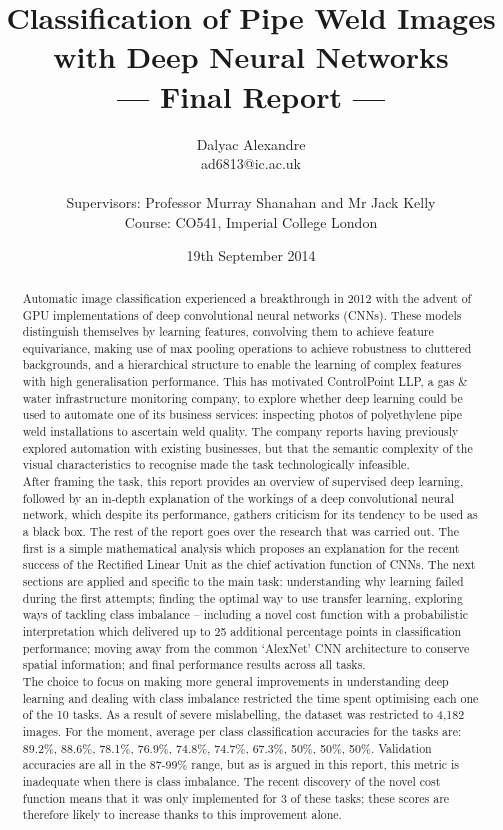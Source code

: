 \documentclass[a4paper,11pt]{article}
\title{Classification of Pipe Weld Images with Deep Neural Networks\\\Large{--- Final Report ---}}
\author{Dalyac Alexandre\\
       ad6813@ic.ac.uk\\ \\
       \small{Supervisors: Professor Murray Shanahan and Mr Jack Kelly}\\
       \small{Course: CO541, Imperial College London}
\date{19th September 2014}
}
\begin{document}
\maketitle

\begin{abstract}

{
Automatic image classification experienced a breakthrough in 2012 with the advent of GPU implementations of deep convolutional neural networks (CNNs). These models distinguish themselves by learning features, convolving them to achieve feature equivariance, making use of max pooling operations to achieve robustness to cluttered backgrounds, and a hierarchical structure to enable the learning of complex features with high generalisation performance. This has motivated ControlPoint LLP, a gas \& water infrastructure monitoring company, to explore whether deep learning could be used to automate one of its business services: inspecting photos of polyethylene pipe weld installations to ascertain weld quality. The company reports having previously explored automation with existing businesses, but that the semantic complexity of the visual characteristics to recognise made the task technologically infeasible. \\

After framing the task, this report provides an overview of supervised deep learning, followed by an in-depth explanation of the workings of a deep convolutional neural network, which despite its performance, gathers criticism for its tendency to be used as a black box. The rest of the report goes over the research that was carried out. The first is a simple mathematical analysis which proposes an explanation for the recent success of the Rectified Linear Unit as the chief activation function of CNNs. The next sections are applied and specific to the main task: understanding why learning failed during the first attempts; finding the optimal way to use transfer learning, exploring ways of tackling class imbalance -- including a novel cost function with a probabilistic interpretation which delivered up to 25 additional percentage points in classification performance; moving away from the common `AlexNet' CNN architecture to conserve spatial information; and final performance results across all tasks. \\

The choice to focus on making more general improvements in understanding deep learning and dealing with class imbalance restricted the time spent optimising each one of the 10 tasks. As a result of severe mislabelling, the dataset was restricted to 4,182 images. For the moment, average per class classification accuracies for the tasks are: 89.2\%, 88.6\%, 78.1\%, 76.9\%, 74.8\%, 74.7\%, 67.3\%, 50\%, 50\%, 50\%. Validation accuracies are all in the 87-99\% range, but as is argued in this report, this metric is inadequate when there is class imbalance. The recent discovery of the novel cost function means that it was only implemented for 3 of these tasks; these scores are therefore likely to increase thanks to this improvement alone. \\
}
\end{abstract}
\end{document}

